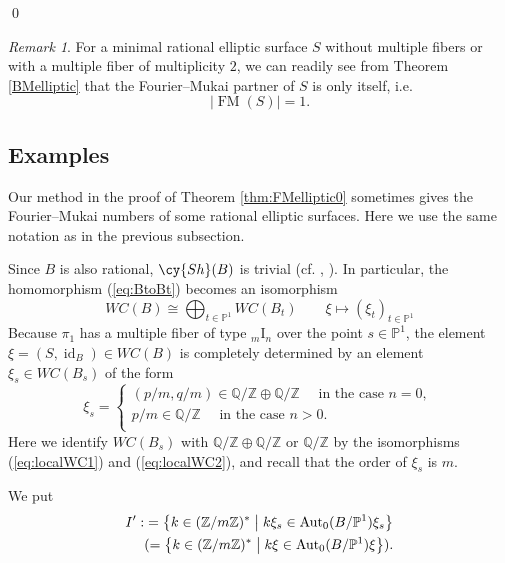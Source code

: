 \documentclass[a4paper,11pt]{article}
\theoremstyle{definition}\newtheorem{defn}[thm]{Definition}
\theoremstyle{remark}\newtheorem{remark}[thm]{Remark}
\numberwithin{equation}{section}
\newcommand{\Aut}{\ensuremath{\operatorname{Aut}}}
\newcommand{\id}{\ensuremath{\operatorname{id}}}
\newcommand{\FM}{\operatorname{FM}}
\newcommand{\rom}{\textrm}
\newcommand{\PP}{\mathbb P}
\newcommand{\Z}{\mathbb Z}
\newcommand{\Q}{\mathbb Q}
\begin{document}
\qed


\begin{remark}\label{rem:FM1}
For a minimal  rational elliptic surface $S$ 
without multiple fibers or with a multiple fiber of multiplicity $2$,
we can readily see from Theorem \ref{BMelliptic} 
that the Fourier--Mukai partner of $S$ is only itself, i.e.
$$|\FM(S)|=1.$$
\end{remark}



\subsection{Examples}\label{subsec:examples}
Our method in the proof of Theorem \ref{thm:FMelliptic0} sometimes 
gives the Fourier--Mukai numbers of some rational  
elliptic surfaces.
Here we use the same notation as in the previous subsection.

Since $B$ is also rational, 
$\cy{Sh}(B)$ is trivial (cf. \cite[Example 1.5.12]{FM94}, \cite[Corollary 5.4.9]{CD89}).  
In particular, the homomorphism (\ref{eq:BtoBt}) becomes an isomorphism
%
\begin{equation}\label{eq:rational}
WC(B)\cong \bigoplus_{t \in \PP ^1} WC(B_{t}) \qquad \xi\mapsto (\xi_t)_{t\in \PP^1}
\end{equation}
%
Because $\pi_1$ has a multiple fiber of type $_m\rom{I}_n$ 
over the point $s\in \PP ^1$, 
 the element $\xi=(S,\id _B)\in WC(B)$ is completely determined by an 
element $\xi_s\in WC(B_s)$ of the form
$$
\xi_s=
\begin{cases}
(p/m,q/m) \in \Q/\Z\oplus\Q/\Z \quad \text{ in the case $n=0$, }\\
p/m \in \Q/\Z \quad \text{ in the case $n>0$. }\\
\end{cases}
$$
Here we identify $WC(B_s)$ with $\Q/\Z\oplus\Q/\Z$ or $\Q/\Z$ by
the isomorphisms (\ref{eq:localWC1}) and (\ref{eq:localWC2}),
and 
recall that the order of $\xi_s$ is $m$.

We put
\begin{align*}
I':&=\bigl\{ 
k\in  (\Z/m\Z)^*  \bigm|
k\xi_s \in \Aut _0(B/\PP^1)\xi_s 
\bigr\}\\
&(=\bigl\{ 
k\in  (\Z/m\Z)^*  \bigm|
k\xi \in \Aut _0(B/\PP^1)\xi 
\bigr\}).
\end{align*}
\end{document}
